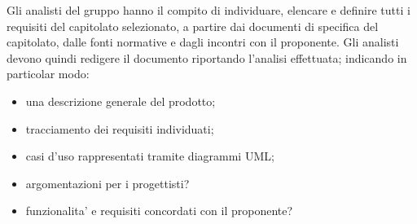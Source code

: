 Gli analisti del gruppo \Gruppo{} hanno il compito di individuare, elencare e definire tutti i requisiti del capitolato selezionato, a partire dai documenti di specifica del capitolato, dalle fonti normative e dagli incontri con il proponente. Gli analisti devono quindi redigere il documento \AnalisiDeiRequisiti{} riportando l'analisi effettuata; indicando in particolar modo:

\begin{itemize}
    \item una descrizione generale del prodotto;
    \item tracciamento dei requisiti individuati;
    \item casi d'uso rappresentati tramite diagrammi UML;
    \item argomentazioni per i progettisti?
    \item funzionalita' e requisiti concordati con il proponente?
\end{itemize}